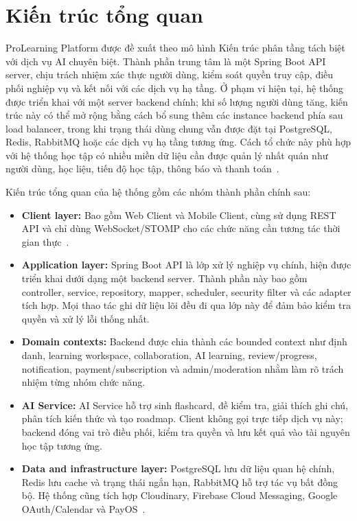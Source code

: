 \section{Kiến trúc tổng quan}
\label{sec:architecture-overview}

ProLearning Platform được đề xuất theo mô hình Kiến trúc phân tầng tách biệt với dịch vụ AI chuyên biệt. Thành phần trung tâm là một Spring Boot API server, chịu trách nhiệm xác thực người dùng, kiểm soát quyền truy cập, điều phối nghiệp vụ và kết nối với các dịch vụ hạ tầng. Ở phạm vi hiện tại, hệ thống được triển khai với một server backend chính; khi số lượng người dùng tăng, kiến trúc này có thể mở rộng bằng cách bổ sung thêm các instance backend phía sau load balancer, trong khi trạng thái dùng chung vẫn được đặt tại PostgreSQL, Redis, RabbitMQ hoặc các dịch vụ hạ tầng tương ứng. Cách tổ chức này phù hợp với hệ thống học tập có nhiều miền dữ liệu cần được quản lý nhất quán như người dùng, học liệu, tiến độ học tập, thông báo và thanh toán~\cite{springbootdocs,springsecurityjwt,springdatajpa}.

Kiến trúc tổng quan của hệ thống gồm các nhóm thành phần chính sau:

\begin{itemize}
    \item \textbf{Client layer:} Bao gồm Web Client và Mobile Client, cùng sử dụng REST API và chỉ dùng WebSocket/STOMP cho các chức năng cần tương tác thời gian thực~\cite{springwebsocketstomp}.

    \item \textbf{Application layer:} Spring Boot API là lớp xử lý nghiệp vụ chính, hiện được triển khai dưới dạng một backend server. Thành phần này bao gồm controller, service, repository, mapper, scheduler, security filter và các adapter tích hợp. Mọi thao tác ghi dữ liệu lõi đều đi qua lớp này để đảm bảo kiểm tra quyền và xử lý lỗi thống nhất.

    \item \textbf{Domain contexts:} Backend được chia thành các bounded context như định danh, learning workspace, collaboration, AI learning, review/progress, notification, payment/subscription và admin/moderation nhằm làm rõ trách nhiệm từng nhóm chức năng.

    \item \textbf{AI Service:} AI Service hỗ trợ sinh flashcard, đề kiểm tra, giải thích ghi chú, phân tích kiến thức và tạo roadmap. Client không gọi trực tiếp dịch vụ này; backend đóng vai trò điều phối, kiểm tra quyền và lưu kết quả vào tài nguyên học tập tương ứng.

    \item \textbf{Data and infrastructure layer:} PostgreSQL lưu dữ liệu quan hệ chính, Redis lưu cache và trạng thái ngắn hạn, RabbitMQ hỗ trợ tác vụ bất đồng bộ. Hệ thống cũng tích hợp Cloudinary, Firebase Cloud Messaging, Google OAuth/Calendar và PayOS~\cite{postgresqlabout,redisoverview,rabbitmqtutorials,cloudinaryjava,firebasefcm,googlecalendarjava,payoswebhook}.
\end{itemize}

